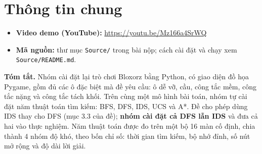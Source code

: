\section*{Thông tin chung}

\begin{itemize}
\item \textbf{Video demo (YouTube):} \url{https://youtu.be/Mz166a4SrWQ}
\item \textbf{Mã nguồn:} thư mục \texttt{Source/} trong bài nộp; cách cài đặt và chạy xem \texttt{Source/README.md}.
\end{itemize}

\textbf{Tóm tắt.} Nhóm cài đặt lại trò chơi Bloxorz bằng Python, có giao diện đồ họa Pygame, gồm đủ các ô đặc biệt mà đề yêu cầu: ô dễ vỡ, cầu, công tắc mềm, công tắc nặng và công tắc tách khối. Trên cùng một mô hình bài toán, nhóm tự cài đặt năm thuật toán tìm kiếm: BFS, DFS, IDS, UCS và A*. Đề cho phép dùng IDS thay cho DFS (mục 3.3 của đề); \textbf{nhóm cài đặt cả DFS lẫn IDS} và đưa cả hai vào thực nghiệm. Năm thuật toán được đo trên một bộ 16 màn cố định, chia thành 4 nhóm độ khó, theo bốn chỉ số: thời gian tìm kiếm, bộ nhớ đỉnh, số nút mở rộng và độ dài lời giải.
